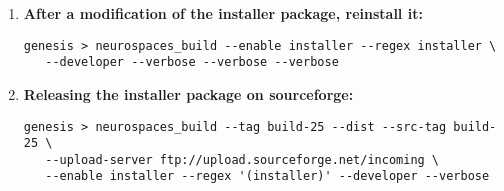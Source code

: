 \documentclass[12pt]{article}
\begin{document}
\begin{enumerate}
\item {\bf After a modification of the installer package, reinstall it:}
\begin{verbatim}
genesis > neurospaces_build --enable installer --regex installer \
   --developer --verbose --verbose --verbose
\end{verbatim}

\item {\bf Releasing the installer package on sourceforge:}
\begin{verbatim}
genesis > neurospaces_build --tag build-25 --dist --src-tag build-25 \
   --upload-server ftp://upload.sourceforge.net/incoming \
   --enable installer --regex '(installer)' --developer --verbose
\end{verbatim}

\end{enumerate}
\end{document}
